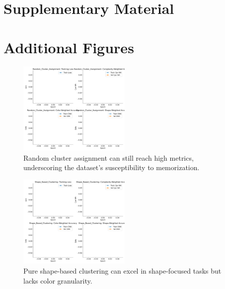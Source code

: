 \documentclass{article} %
\theoremstyle{plain}
\theoremstyle{definition}
\theoremstyle{remark}
\begin{document}
\appendix

\section*{\LARGE Supplementary Material}

\section{Additional Figures}
\begin{figure}[h]
\centering
\includegraphics[width=0.48\textwidth]{Random_Cluster_Assignment_Aggregated.png}
\caption{Random cluster assignment can still reach high metrics, underscoring the dataset's susceptibility to memorization.}
\end{figure}

\begin{figure}[h]
\centering
\includegraphics[width=0.48\textwidth]{Shape_Based_Clustering_Aggregated.png}
\caption{Pure shape-based clustering can excel in shape-focused tasks but lacks color granularity.}
\end{figure}
\end{document}
